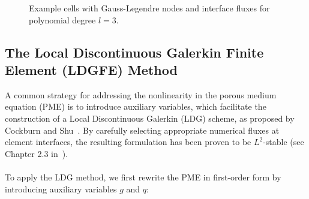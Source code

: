 \documentclass[a4paper,12pt]{paper}
\begin{document}
\begin{figure}[h]
	\centering
	\caption{Example cells with Gauss-Legendre nodes and interface fluxes for polynomial degree \( l=3 \).}
	\label{fig:example_cells}
\end{figure}



\subsection{The Local Discontinuous Galerkin Finite Element (LDGFE) Method}\label{sec:LDG}
A common strategy for addressing the nonlinearity in the porous medium equation (PME) is to introduce auxiliary variables, which facilitate the construction of a Local Discontinuous Galerkin (LDG) scheme, as proposed by Cockburn and Shu~\cite{CockburnandShuLDG}. By carefully selecting appropriate numerical fluxes at element interfaces, the resulting formulation has been proven to be \( L^2 \)-stable (see Chapter 2.3 in~\cite{CockburnandShuLDG}).\\
\\
To apply the LDG method, we first rewrite the PME in first-order form by introducing auxiliary variables \( g \) and \( q \):
\end{document}

